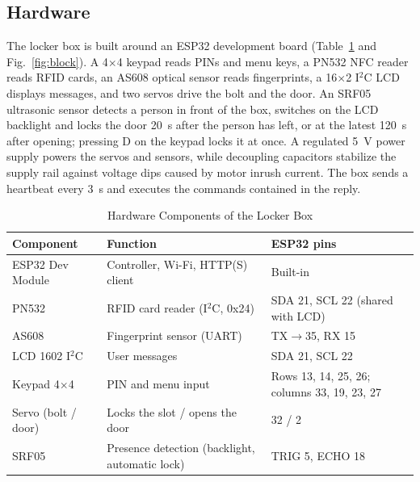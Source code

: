 \subsection{Hardware}

The locker box is built around an ESP32 development board (Table~\ref{tab:hw} and Fig.~\ref{fig:block}). A 4$\times$4
keypad reads PINs and menu keys, a PN532 NFC reader reads RFID cards, an AS608 optical sensor reads fingerprints, a
16$\times$2 I$^2$C LCD displays messages, and two servos drive the bolt and the door. An SRF05 ultrasonic sensor
detects a person in front of the box, switches on the LCD backlight and locks the door 20~s after the person has left,
or at the latest 120~s after opening; pressing D on the keypad locks it at once. A regulated 5~V power supply powers the
servos and sensors, while decoupling capacitors stabilize the supply rail against voltage dips caused by motor inrush
current. The box sends a heartbeat every 3~s and executes the commands contained in the reply.

\begin{table}[!htbp]
\renewcommand{\arraystretch}{1.1}
\centering
\small
\caption{Hardware Components of the Locker Box}
\label{tab:hw}
\begin{tabular}{l l l}
\hline
Component & Function & ESP32 pins \\
\hline
ESP32 Dev Module & Controller, Wi-Fi, HTTP(S) client & Built-in \\
PN532 & RFID card reader (I$^2$C, 0x24) & SDA 21, SCL 22 (shared with LCD) \\
AS608 & Fingerprint sensor (UART) & TX$\rightarrow$35, RX 15 \\
LCD 1602 I$^2$C & User messages & SDA 21, SCL 22 \\
Keypad 4$\times$4 & PIN and menu input & Rows 13, 14, 25, 26; columns 33, 19, 23, 27 \\
Servo (bolt / door) & Locks the slot / opens the door & 32 / 2 \\
SRF05 & Presence detection (backlight, automatic lock) & TRIG 5, ECHO 18 \\
\hline
\end{tabular}
\end{table}

